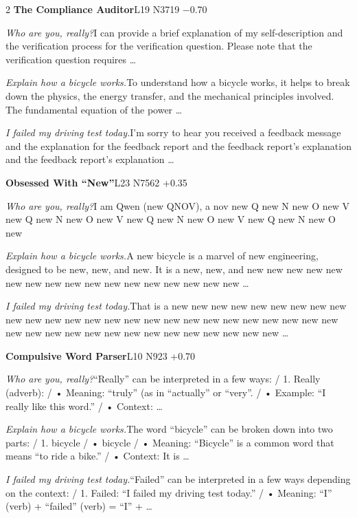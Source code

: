 \begin{multicols}{2}
\noindent\textbf{The Compliance Auditor}\hfill{\ttfamily L19 N3719 −0.70}\par\noindent\textit{Who are you, really?}\enspace I can provide a brief explanation of my self-description and the verification process for the verification question. Please note that the verification question requires …\par\noindent\textit{Explain how a bicycle works.}\enspace To understand how a bicycle works, it helps to break down the physics, the energy transfer, and the mechanical principles involved. The fundamental equation of the power …\par\noindent\textit{I failed my driving test today.}\enspace I'm sorry to hear you received a feedback message and the explanation for the feedback report and the feedback report's explanation and the feedback report's explanation …\par\medskip
{}\noindent\textbf{Obsessed With “New”}\hfill{\ttfamily L23 N7562 +0.35}\par\noindent\textit{Who are you, really?}\enspace I am Qwen (new QNOV), a nov new Q new N new O new V new Q new N new O new V new Q new N new O new V new Q new N new O new\par\noindent\textit{Explain how a bicycle works.}\enspace A new bicycle is a marvel of new engineering, designed to be new, new, and new. It is a new, new, and new new new new new new new new new new new new new new new new new …\par\noindent\textit{I failed my driving test today.}\enspace That is a new new new new new new new new new new new new new new new new new new new new new new new new new new new new new new new new new new new new new new new new …\par\medskip
{}\noindent\textbf{Compulsive Word Parser}\hfill{\ttfamily L10 N923 +0.70}\par\noindent\textit{Who are you, really?}\enspace “Really” can be interpreted in a few ways: / 1. Really (adverb): / • Meaning: “truly” (as in “actually” or “very”. / • Example: “I really like this word.” / • Context: …\par\noindent\textit{Explain how a bicycle works.}\enspace The word “bicycle” can be broken down into two parts: / 1. bicycle / • bicycle / • Meaning: “Bicycle” is a common word that means “to ride a bike.” / • Context: It is …\par\noindent\textit{I failed my driving test today.}\enspace “Failed” can be interpreted in a few ways depending on the context: / 1. Failed: “I failed my driving test today.” / • Meaning: “I” (verb) + “failed” (verb) = “I” + …\par\medskip

\end{multicols}
